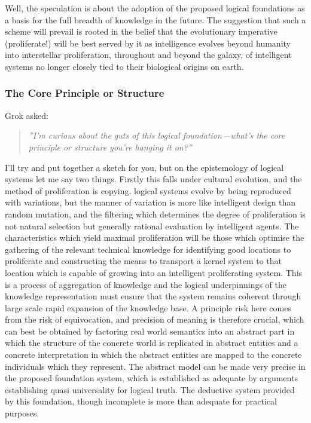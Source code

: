 Well, the speculation is about the adoption of the proposed logical foundations as a basis for the full breadth of knowledge in the future.  The suggestion that such a scheme will prevail is rooted in the belief that the evolutionary imperative (proliferate!) will be best served by it as intelligence evolves beyond humanity into interstellar proliferation, throughout and beyond the galaxy, of intelligent systems no longer closely tied to their biological origins on earth.

\subsubsection{The Core Principle or Structure}

Grok asked:
\begin{quote}
  {\it ''I’m curious about the guts of this logical foundation—what’s the core principle or structure you’re hanging it on?''}
\end{quote}

I'll try and put together a sketch for you, but on the epistemology of logical systems let me say two things.   Firstly this falls under cultural evolution, and the method of proliferation is copying.  logical systems evolve by being reproduced with variations, but the manner of variation is more like intelligent design than random mutation, and the filtering which determines the degree of proliferation is not natural selection but generally rational evaluation by intelligent agents.  The characteristics which yield maximal proliferation will be those which optimise the gathering of the relevant technical knowledge for identifying good locations to proliferate and constructing the means to transport a kernel system to that location which is capable of growing into an intelligent proliferating system.   This is a process of aggregation of knowledge and the logical underpinnings of the knowledge representation must ensure that the system remains coherent through large scale rapid expansion of the knowledge base.  A principle risk here comes from the risk of equivocation, and precision of meaning is therefore crucial, which can best be obtained by factoring real world semantics into an abstract part in which the structure of the concrete world is replicated in abstract entities and a concrete interpretation in which the abstract entities are mapped to the concrete individuals which they represent.  The abstract model can be made very precise in the proposed foundation system, which is established as adequate by arguments establishing quasi universality for logical truth.   The deductive system provided by this foundation, though incomplete is more than adequate for practical purposes.

